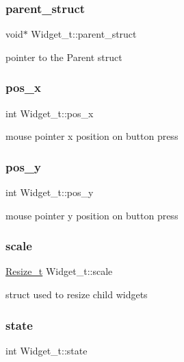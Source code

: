 \subsubsection{\texorpdfstring{parent\+\_\+struct}{parent\_struct}}
{\footnotesize\ttfamily void$\ast$ Widget\+\_\+t\+::parent\+\_\+struct}

pointer to the Parent struct \mbox{\label{structWidget__t_ae2d46ffb30bb2335a043d138fa05e1a3}} 
\subsubsection{\texorpdfstring{pos\+\_\+x}{pos\_x}}
{\footnotesize\ttfamily int Widget\+\_\+t\+::pos\+\_\+x}

mouse pointer x position on button press \mbox{\label{structWidget__t_a9b127ac6b3f017b367351ee673e063c3}} 
\subsubsection{\texorpdfstring{pos\+\_\+y}{pos\_y}}
{\footnotesize\ttfamily int Widget\+\_\+t\+::pos\+\_\+y}

mouse pointer y position on button press \mbox{\label{structWidget__t_a9a2d5b53f40f5bf3914fc0694027d7ec}} 
\subsubsection{\texorpdfstring{scale}{scale}}
{\footnotesize\ttfamily \hyperlink{structResize__t}{Resize\+\_\+t} Widget\+\_\+t\+::scale}

struct used to resize child widgets \mbox{\label{structWidget__t_aaa935b64805fdeb78acb015c67d6638c}} 
\subsubsection{\texorpdfstring{state}{state}}
{\footnotesize\ttfamily int Widget\+\_\+t\+::state}


